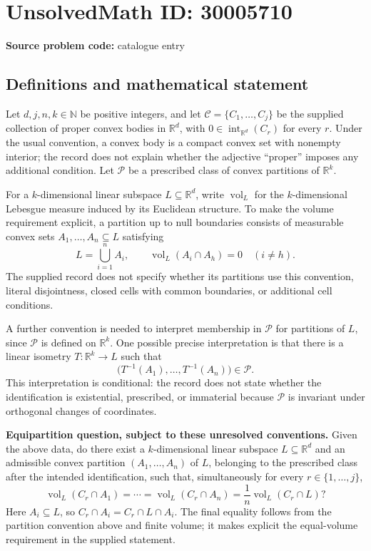 \documentclass[11pt]{article}
\newcommand{\N}{\mathbb{N}}
\newcommand{\R}{\mathbb{R}}
\begin{document}
\section*{UnsolvedMath ID: 30005710}
\textbf{Source problem code:} catalogue entry
\subsection{Definitions and mathematical statement}
Let \(d,j,n,k\in\N\) be positive integers, and let \(\mathcal C=\{C_1,\ldots,C_j\}\) be the supplied collection of proper convex bodies in \(\R^d\), with \(0\in\operatorname{int}_{\R^d}(C_r)\) for every \(r\). Under the usual convention, a convex body is a compact convex set with nonempty interior; the record does not explain whether the adjective ``proper'' imposes any additional condition. Let \(\mathcal P\) be a prescribed class of convex partitions of \(\R^k\).

For a \(k\)-dimensional linear subspace \(L\subseteq\R^d\), write \(\operatorname{vol}_L\) for the \(k\)-dimensional Lebesgue measure induced by its Euclidean structure. To make the volume requirement explicit, a partition up to null boundaries consists of measurable convex sets \(A_1,\ldots,A_n\subseteq L\) satisfying
\[
L=\bigcup_{i=1}^n A_i,
\qquad
\operatorname{vol}_L(A_i\cap A_h)=0\quad(i\ne h).
\]
The supplied record does not specify whether its partitions use this convention, literal disjointness, closed cells with common boundaries, or additional cell conditions.

A further convention is needed to interpret membership in \(\mathcal P\) for partitions of \(L\), since \(\mathcal P\) is defined on \(\R^k\). One possible precise interpretation is that there is a linear isometry \(T\colon\R^k\to L\) such that
\[
\bigl(T^{-1}(A_1),\ldots,T^{-1}(A_n)\bigr)\in\mathcal P.
\]
This interpretation is conditional: the record does not state whether the identification is existential, prescribed, or immaterial because \(\mathcal P\) is invariant under orthogonal changes of coordinates.

\textbf{Equipartition question, subject to these unresolved conventions.} Given the above data, do there exist a \(k\)-dimensional linear subspace \(L\subseteq\R^d\) and an admissible convex partition \((A_1,\ldots,A_n)\) of \(L\), belonging to the prescribed class after the intended identification, such that, simultaneously for every \(r\in\{1,\ldots,j\}\),
\[
\operatorname{vol}_L(C_r\cap A_1)=\cdots=
\operatorname{vol}_L(C_r\cap A_n)
=\frac{1}{n}\operatorname{vol}_L(C_r\cap L)?
\]
Here \(A_i\subseteq L\), so \(C_r\cap A_i=C_r\cap L\cap A_i\). The final equality follows from the partition convention above and finite volume; it makes explicit the equal-volume requirement in the supplied statement.
\end{document}
